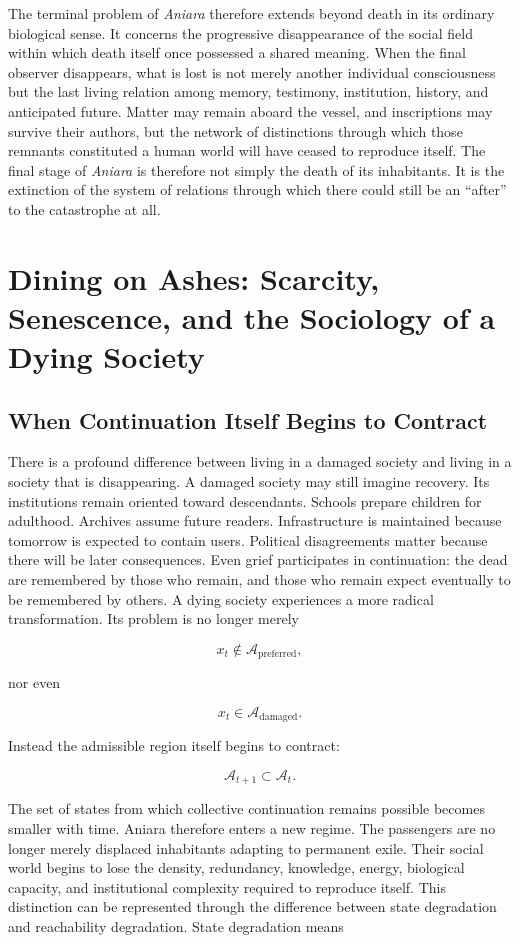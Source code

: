 \documentclass[11pt,oneside]{book}
\theoremstyle{definition}
\theoremstyle{remark}
\newcommand{\A}{\mathcal{A}}
\begin{document}
The terminal problem of \emph{Aniara} therefore extends beyond death in its ordinary biological sense. It concerns the progressive disappearance of the social field within which death itself once possessed a shared meaning. When the final observer disappears, what is lost is not merely another individual consciousness but the last living relation among memory, testimony, institution, history, and anticipated future. Matter may remain aboard the vessel, and inscriptions may survive their authors, but the network of distinctions through which those remnants constituted a human world will have ceased to reproduce itself. The final stage of \emph{Aniara} is therefore not simply the death of its inhabitants. It is the extinction of the system of relations through which there could still be an ``after'' to the catastrophe at all.

\chapter{Dining on Ashes: Scarcity, Senescence, and the Sociology of a Dying Society}

\section{When Continuation Itself Begins to Contract}

There is a profound difference between living in a damaged society and living in a society that is
disappearing. A damaged society may still imagine recovery. Its institutions remain oriented toward
descendants. Schools prepare children for adulthood. Archives assume future readers. Infrastructure
is maintained because tomorrow is expected to contain users. Political disagreements matter because
there will be later consequences. Even grief participates in continuation: the dead are remembered
by those who remain, and those who remain expect eventually to be remembered by others. A dying
society experiences a more radical transformation. Its problem is no longer merely

\[
x_t\notin\A_{\mathrm{preferred}},
\]

nor even

\[
x_t\in\A_{\mathrm{damaged}}.
\]

Instead the admissible region itself begins to contract:

\[
\A_{t+1}\subset\A_t.
\]

The set of states from which collective continuation remains possible becomes smaller with time.
Aniara therefore enters a new regime. The passengers are no longer merely displaced inhabitants
adapting to permanent exile. Their social world begins to lose the density, redundancy, knowledge,
energy, biological capacity, and institutional complexity required to reproduce itself. This
distinction can be represented through the difference between state degradation and reachability
degradation. State degradation means
\end{document}
